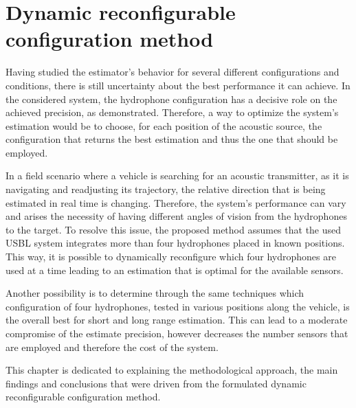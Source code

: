 \chapter{Dynamic reconfigurable configuration method}  \label{chap:study}

Having studied the estimator's behavior for several different configurations and conditions, there is still uncertainty about the best performance it can achieve. In the considered system, the hydrophone configuration has a decisive role on the achieved precision, as demonstrated. Therefore, a way to optimize the system's estimation would be to choose, for each position of the acoustic source, the configuration that returns the best estimation and thus the one that should be employed.

In a field scenario where a vehicle is searching for an acoustic transmitter, as it is navigating and readjusting its trajectory, the relative direction that is being estimated in real time is changing. Therefore, the system's performance can vary and arises the necessity of having different angles of vision from the hydrophones to the target. To resolve this issue, the proposed method assumes that the used USBL system integrates more than four hydrophones placed in known positions. This way, it is possible to dynamically reconfigure which four hydrophones are used at a time leading to an estimation that is optimal for the available sensors. 

Another possibility is to determine through the same techniques which configuration of four hydrophones, tested in various positions along the vehicle, is the overall best for short and long range estimation. This can lead to a moderate compromise of the estimate precision, however decreases the number sensors that are employed and therefore the cost of the system.

This chapter is dedicated to explaining the methodological approach, the main findings and conclusions that were driven from the formulated dynamic reconfigurable configuration method.



